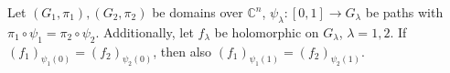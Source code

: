 Let $(G_1, \pi_1), (G_2, \pi_2)$ be domains over $\mathbb{C}^n$, $\psi_\lambda : [0, 1] \rightarrow G_\lambda$ be paths with $\pi_1 \circ \psi_1 = \pi_2 \circ \psi_2$. Additionally, let $f_\lambda$ be holomorphic on $G_\lambda$, $\lambda = 1, 2$. If $(f_1)_{\psi_1(0)} = (f_2)_{\psi_2(0)}$, then also $(f_1)_{\psi_1(1)} = (f_2)_{\psi_2(1)}$.
